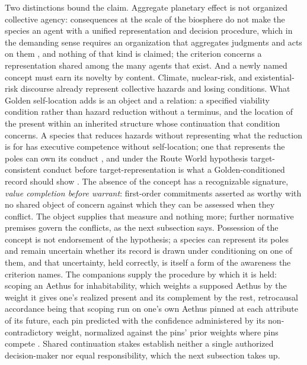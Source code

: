 Two distinctions bound the claim. Aggregate planetary effect is not
organized collective agency: consequences at the scale of the biosphere do
not make the species an agent with a unified representation and decision
procedure, which in the demanding sense requires an organization that
aggregates judgments and acts on them \cite{ListPettit11}, and nothing of
that kind is claimed; the criterion concerns a representation shared among
the many agents that exist. And a newly named concept must earn its novelty
by content. Climate, nuclear-risk, and existential-risk discourse already
represent collective hazards and losing conditions. What Golden self-location
adds is an object and a relation: a specified viability condition rather than
hazard reduction without a terminus, and the location of the present within
an inherited structure whose continuation that condition concerns. A species
that reduces hazards without representing what the reduction is for has
executive competence without self-location; one that represents the poles
can own its conduct \cite{GoldenCivNature}, and under the Route World
hypothesis target-consistent conduct before target-representation is what a
Golden-conditioned record should show \cite{GoldenRouteWorld}. The absence of the concept has a recognizable
signature, \emph{value completion before warrant}: first-order commitments
asserted as worthy with no shared object of concern against which they can be
assessed when they conflict. The object supplies that measure and nothing
more; further normative premises govern the conflicts, as the next subsection
says. Possession of the concept is not endorsement of
the hypothesis; a species can represent its poles and remain uncertain whether
its record is drawn under conditioning on one of them, and that uncertainty,
held correctly, is itself a form of the awareness the criterion names.
The companions supply the procedure by which it is held: scoping an Aethus
for inhabitability, which weights a supposed Aethus by the weight it gives
one's realized present and its complement by the rest, retrocausal
accordance being that scoping run on one's own Aethus pinned at each
attribute of its future, each pin predicted with the confidence
administered by its non-contradictory weight, normalized against the pins'
prior weights where pins compete \cite{GoldenTargeted}. Shared
continuation stakes establish neither a single authorized decision-maker nor
equal responsibility, which the next subsection takes up.

